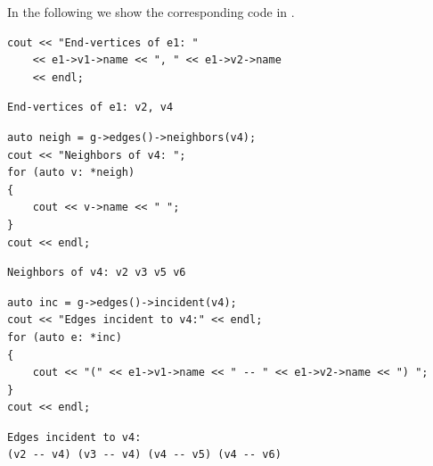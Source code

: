 In the following we show the corresponding code in .
\begin{lstlisting}[style=c++] 
cout << "End-vertices of e1: "
    << e1->v1->name << ", " << e1->v2->name 
    << endl;
\end{lstlisting}
\begin{lstlisting}[style=out]
End-vertices of e1: v2, v4
\end{lstlisting}

\begin{lstlisting}[style=c++]
auto neigh = g->edges()->neighbors(v4);
cout << "Neighbors of v4: ";
for (auto v: *neigh)
{
    cout << v->name << " ";
}
cout << endl;
\end{lstlisting}
\begin{lstlisting}[style=out]
Neighbors of v4: v2 v3 v5 v6 
\end{lstlisting}

\begin{lstlisting}[style=c++] 
auto inc = g->edges()->incident(v4);
cout << "Edges incident to v4:" << endl;
for (auto e: *inc)
{
    cout << "(" << e1->v1->name << " -- " << e1->v2->name << ") ";
}
cout << endl;
\end{lstlisting}
\begin{lstlisting}[style=out]
Edges incident to v4:
(v2 -- v4) (v3 -- v4) (v4 -- v5) (v4 -- v6) 
\end{lstlisting}









